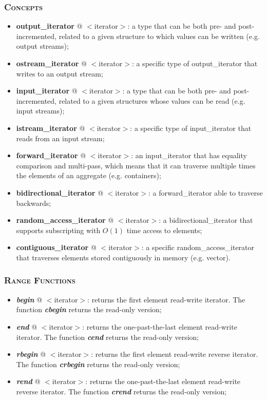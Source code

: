 \documentclass[10pt]{article}
\begin{document}
\begin{multicols*}{5}
{\subsubsection*{\textsc{Concepts}} 
\begin{itemize}[leftmargin=*,topsep=0.25pt]
  \setlength\itemsep{-1.8pt}
	\item \textbf{output\_iterator} @ $<$iterator$>$: a type that can be both pre- and post-incremented, related to a given structure to which values can be written (e.g. output streams);
	\item \textbf{ostream\_iterator} @ $<$iterator$>$: a specific type of out\-put\_i\-te\-ra\-tor that writes to an output stream;
	\item \textbf{input\_iterator} @ $<$iterator$>$: a type that can be both pre- and post-incremented, related to a given structures whose values can be read (e.g. input streams);
	\item \textbf{istream\_iterator} @ $<$iterator$>$: a specific type of in\-put\_i\-te\-ra\-tor that reads from an input stream;
	\item \textbf{forward\_iterator} @ $<$iterator$>$: an input\_iterator that has equality comparison and multi-pass, which means that it can traverse multiple times the elements of an aggregate (e.g. containers); 
	\item \textbf{bidirectional\_iterator} @ $<$iterator$>$: a forward\_iterator able to traverse backwards; 
	\item \textbf{random\_access\_iterator} @ $<$iterator$>$: a bidirectional\_iterator that supports subscripting with $O(1)$ time access to elements; 
	\item \textbf{contiguous\_iterator} @ $<$iterator$>$: a specific ran\-dom\_ac\-cess\_i\-te\-ra\-tor that traverses elements stored contiguously in memory (e.g. vector). 
\end{itemize}

\subsubsection*{\textsc{Range Functions}} 
\begin{itemize}[leftmargin=*,topsep=0.25pt]
  \setlength\itemsep{-1.8pt}
	\item  \emph{\textbf{begin}} @ $<$iterator$>$: returns the first element read-write iterator. The function \emph{\textbf{cbegin}} returns the read-only version;
	\item  \emph{\textbf{end}} @ $<$iterator$>$: returns the one-past-the-last element read-write iterator. The function \emph{\textbf{cend}} returns the read-only version;
	\item  \emph{\textbf{rbegin}} @ $<$iterator$>$: returns the first element read-write reverse iterator. The function \emph{\textbf{crbegin}} returns the read-only version;
	\item  \emph{\textbf{rend}} @ $<$iterator$>$: returns the one-past-the-last element read-write reverse iterator. The function \emph{\textbf{crend}} returns the read-only version;
\end{itemize}

}
\end{multicols*}
\end{document}
